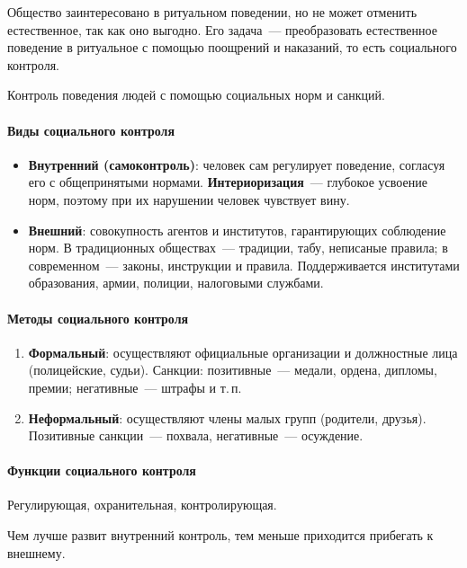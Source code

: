 \documentclass[12pt]{article}
\begin{document}
	Общество заинтересовано в ритуальном поведении, но не может отменить естественное, так как оно выгодно. Его задача~--- преобразовать естественное поведение в ритуальное с помощью поощрений и наказаний, то есть социального контроля.

	\begin{definition}
		Контроль поведения людей с помощью социальных норм и санкций.
	\end{definition}

	\paragraph{Виды социального контроля}
	\begin{itemize}
		\item \textbf{Внутренний (самоконтроль)}: человек сам регулирует поведение, согласуя его с общепринятыми нормами. \textbf{Интериоризация}~--- глубокое усвоение норм, поэтому при их нарушении человек чувствует вину.
		\item \textbf{Внешний}: совокупность агентов и институтов, гарантирующих соблюдение норм. В традиционных обществах~--- традиции, табу, неписаные правила; в современном~--- законы, инструкции и правила. Поддерживается институтами образования, армии, полиции, налоговыми службами.
	\end{itemize}

	\paragraph{Методы социального контроля}
	\begin{enumerate}
		\item \textbf{Формальный}: осуществляют официальные организации и должностные лица (полицейские, судьи). Санкции: позитивные~--- медали, ордена, дипломы, премии; негативные~--- штрафы и т.\,п.
		\item \textbf{Неформальный}: осуществляют члены малых групп (родители, друзья). Позитивные санкции~--- похвала, негативные~--- осуждение.
	\end{enumerate}

	\paragraph{Функции социального контроля}
	Регулирующая, охранительная, контролирующая.

	\begin{note}
		Чем лучше развит внутренний контроль, тем меньше приходится прибегать к внешнему.
	\end{note}
\end{document}
